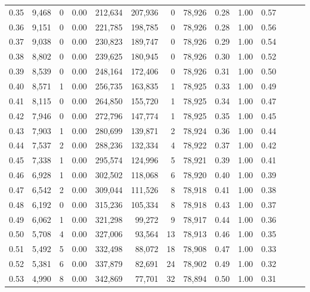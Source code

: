 \begin{tabular}{rrrrrrrrrrrrrr}
0.35 &  9,468 &      0 &  0.00 &  212,634 &  207,936 &       0 &  78,926 &  0.28 &  1.00 &      0.57 \\
0.36 &  9,151 &      0 &  0.00 &  221,785 &  198,785 &       0 &  78,926 &  0.28 &  1.00 &      0.56 \\
0.37 &  9,038 &      0 &  0.00 &  230,823 &  189,747 &       0 &  78,926 &  0.29 &  1.00 &      0.54 \\
0.38 &  8,802 &      0 &  0.00 &  239,625 &  180,945 &       0 &  78,926 &  0.30 &  1.00 &      0.52 \\
0.39 &  8,539 &      0 &  0.00 &  248,164 &  172,406 &       0 &  78,926 &  0.31 &  1.00 &      0.50 \\
0.40 &  8,571 &      1 &  0.00 &  256,735 &  163,835 &       1 &  78,925 &  0.33 &  1.00 &      0.49 \\
0.41 &  8,115 &      0 &  0.00 &  264,850 &  155,720 &       1 &  78,925 &  0.34 &  1.00 &      0.47 \\
0.42 &  7,946 &      0 &  0.00 &  272,796 &  147,774 &       1 &  78,925 &  0.35 &  1.00 &      0.45 \\
0.43 &  7,903 &      1 &  0.00 &  280,699 &  139,871 &       2 &  78,924 &  0.36 &  1.00 &      0.44 \\
0.44 &  7,537 &      2 &  0.00 &  288,236 &  132,334 &       4 &  78,922 &  0.37 &  1.00 &      0.42 \\
0.45 &  7,338 &      1 &  0.00 &  295,574 &  124,996 &       5 &  78,921 &  0.39 &  1.00 &      0.41 \\
0.46 &  6,928 &      1 &  0.00 &  302,502 &  118,068 &       6 &  78,920 &  0.40 &  1.00 &      0.39 \\
0.47 &  6,542 &      2 &  0.00 &  309,044 &  111,526 &       8 &  78,918 &  0.41 &  1.00 &      0.38 \\
0.48 &  6,192 &      0 &  0.00 &  315,236 &  105,334 &       8 &  78,918 &  0.43 &  1.00 &      0.37 \\
0.49 &  6,062 &      1 &  0.00 &  321,298 &   99,272 &       9 &  78,917 &  0.44 &  1.00 &      0.36 \\
0.50 &  5,708 &      4 &  0.00 &  327,006 &   93,564 &      13 &  78,913 &  0.46 &  1.00 &      0.35 \\
0.51 &  5,492 &      5 &  0.00 &  332,498 &   88,072 &      18 &  78,908 &  0.47 &  1.00 &      0.33 \\
0.52 &  5,381 &      6 &  0.00 &  337,879 &   82,691 &      24 &  78,902 &  0.49 &  1.00 &      0.32 \\
0.53 &  4,990 &      8 &  0.00 &  342,869 &   77,701 &      32 &  78,894 &  0.50 &  1.00 &      0.31 \\

\end{tabular}
